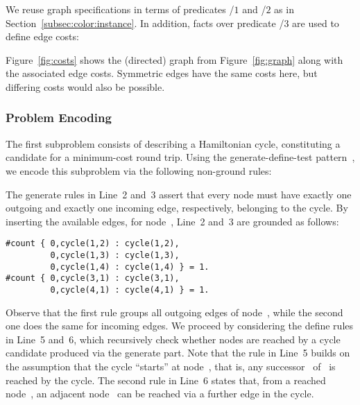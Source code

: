 We reuse graph specifications in terms of predicates /$1$ and /$2$
as in Section~\ref{subsec:color:instance}.
In addition, facts over predicate /$3$ are used to define edge costs:
%

%
Figure~\ref{fig:costs} shows the (directed) graph from Figure~\ref{fig:graph}
along with the associated edge costs.
Symmetric edges have the same costs here,
but differing costs would also be possible.


\subsubsection{Problem Encoding}\label{subsec:tsp:encoding}

The first subproblem consists of describing a Hamiltonian cycle,
constituting a candidate for a minimum-cost round trip.
Using the generate-define-test pattern~\cite{lifschitz02a},
we encode this subproblem via the following non-ground rules:
%

%
The generate rules in Line~2 and~3 assert that every node must have
exactly one outgoing and exactly one incoming edge, respectively,
belonging to the cycle.
By inserting the available edges, for node~,
Line~2 and~3 are grounded as follows:%
%
\begin{lstlisting}[numbers=none]
#count { 0,cycle(1,2) : cycle(1,2),
         0,cycle(1,3) : cycle(1,3),
         0,cycle(1,4) : cycle(1,4) } = 1.
#count { 0,cycle(3,1) : cycle(3,1), 
         0,cycle(4,1) : cycle(4,1) } = 1.
\end{lstlisting}
%
Observe that the first rule groups all outgoing edges of node~,
while the second one does the same for incoming edges.
We proceed by considering the define rules in Line~5 and~6,
which recursively check whether nodes are reached by a cycle candidate
produced via the generate part.
Note that the rule in Line~5 builds on the assumption that the cycle
``starts'' at node~, that is,
any successor~ of~ is reached by the cycle.
The second rule in Line~6 states that, from a reached node~,
an adjacent node~ can be reached via a further edge in the cycle.
